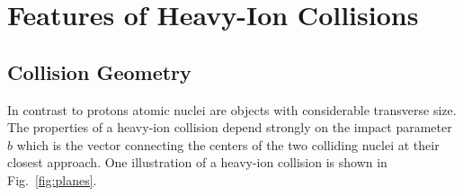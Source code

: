 



\pagebreak
\FloatBarrier
\pagebreak
\section{Features of Heavy-Ion Collisions}
\label{sec:features}
\subsection{Collision Geometry}
In contrast to protons atomic nuclei are objects with considerable transverse size. The properties of a heavy-ion collision depend strongly on the impact parameter $b$ which is the vector connecting the centers of the two colliding nuclei at their closest approach. One illustration of a heavy-ion collision is shown in Fig.~\ref{fig:planes}.



